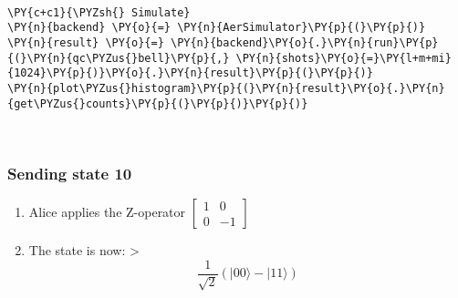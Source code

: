     \begin{center}
    \end{center}
    { \hspace*{\fill} \\}
    

    \begin{tcolorbox}[breakable, size=fbox, boxrule=1pt, pad at break*=1mm,colback=cellbackground, colframe=cellborder]
\begin{Verbatim}[commandchars=\\\{\}]
\PY{c+c1}{\PYZsh{} Simulate}
\PY{n}{backend} \PY{o}{=} \PY{n}{AerSimulator}\PY{p}{(}\PY{p}{)}
\PY{n}{result} \PY{o}{=} \PY{n}{backend}\PY{o}{.}\PY{n}{run}\PY{p}{(}\PY{n}{qc\PYZus{}bell}\PY{p}{,} \PY{n}{shots}\PY{o}{=}\PY{l+m+mi}{1024}\PY{p}{)}\PY{o}{.}\PY{n}{result}\PY{p}{(}\PY{p}{)}
\PY{n}{plot\PYZus{}histogram}\PY{p}{(}\PY{n}{result}\PY{o}{.}\PY{n}{get\PYZus{}counts}\PY{p}{(}\PY{p}{)}\PY{p}{)}
\end{Verbatim}
\end{tcolorbox}
 
            
    
    \begin{center}
    \end{center}
    { \hspace*{\fill} \\}
    

    \hypertarget{sending-state-10}{%
\subsubsection*{Sending state 10}\label{sending-state-10}}

\begin{enumerate}
\def\labelenumi{\arabic{enumi}.}
\tightlist
\item
  Alice applies the Z-operator
  \(\begin{bmatrix} 1 & 0 \\ 0 & -1 \end{bmatrix}\)
\item
  The state is now: \textgreater{}
  \[\frac{1}{\sqrt{2}}(\lvert 00\rangle - \lvert 11\rangle)\]
\end{enumerate}


